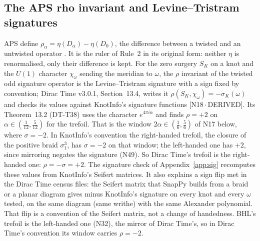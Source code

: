 \documentclass[11pt]{article}
\theoremstyle{definition}
\newcommand{\dtag}[1]{#1}
\begin{document}
\subsection{The APS rho invariant and Levine--Tristram signatures}
APS define $\rho_\alpha=\eta(D_\alpha)-\eta(D_0)$, the difference between a twisted and an untwisted operator \cite{APS2}. It is the ruler of Rule~2 in its original form: neither $\eta$ is renormalised, only their difference is kept. For the zero surgery $S_K$ on a knot and the $U(1)$ character $\chi_\omega$ sending the meridian to $\omega$, the $\rho$ invariant of the twisted odd signature operator is the Levine--Tristram signature with a sign fixed by convention; Dirac Time v3.0.1, Section~13.4, writes it $\rho(S_K,\chi_\omega)=-\sigma_K(\omega)$ and checks its values against KnotInfo's signature functions \cite{DiracTime,KnotInfo} \dtag{\textsf{\small[N18\,$\cdot$\,DERIVED]}}. Its Theorem~13.2 (DT-T38) uses the character $e^{4\pi i\alpha}$ and finds $\rho=+2$ on $\alpha\in(\tfrac1{12},\tfrac5{12})$ for the trefoil. That is the window $2\alpha\in(\tfrac16,\tfrac56)$ of N17 below, where $\sigma=-2$. In KnotInfo's convention the right-handed trefoil, the closure of the positive braid $\sigma_1^3$, has $\sigma=-2$ on that window; the left-handed one has $+2$, since mirroring negates the signature (N49). So Dirac Time's trefoil is the right-handed one: $\rho=-\sigma=+2$. The signature check of Appendix~\ref{app:sig} recomputes these values from KnotInfo's Seifert matrices. It also explains a sign flip met in the Dirac Time census files: the Seifert matrix that SnapPy builds from a braid or a planar diagram gives minus KnotInfo's signature on every knot and every $\omega$ tested, on the same diagram (same writhe) with the same Alexander polynomial. That flip is a convention of the Seifert matrix, not a change of handedness. BHL's trefoil is the left-handed one (N32), the mirror of Dirac Time's, so in Dirac Time's convention its window carries $\rho=-2$.
\end{document}
